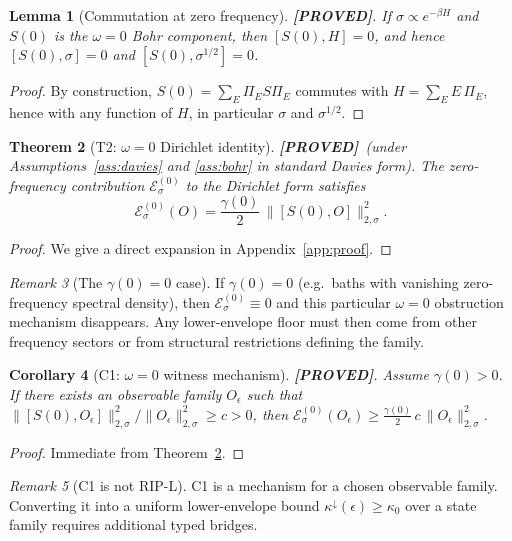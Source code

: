 \documentclass[11pt]{article}
\newtheorem{theorem}{Theorem}[section]
\newtheorem{lemma}[theorem]{Lemma}
\newtheorem{corollary}[theorem]{Corollary}
\theoremstyle{definition}
\theoremstyle{remark}
\newtheorem{remark}[theorem]{Remark}
\newcommand{\PROVED}{\textcolor{green!60!black}{\textbf{[PROVED]}}}
\begin{document}
\begin{lemma}[Commutation at zero frequency]
\label{lem:commute}
\PROVED. If $\sigma \propto e^{-\beta H}$ and $S(0)$ is the $\omega = 0$
Bohr component, then $[S(0), H] = 0$, and hence $[S(0), \sigma] = 0$ and
$[S(0), \sigma^{1/2}] = 0$.
\end{lemma}

\begin{proof}
By construction, $S(0) = \sum_E \Pi_E S \Pi_E$ commutes with $H = \sum_E
E\, \Pi_E$, hence with any function of $H$, in particular $\sigma$ and
$\sigma^{1/2}$.
\end{proof}

\begin{theorem}[T2: $\omega = 0$ Dirichlet identity]
\label{thm:omega0}
\PROVED\ (under Assumptions~\ref{ass:davies} and \ref{ass:bohr} in
standard Davies form). The zero-frequency contribution
$\mathcal{E}^{(0)}_\sigma$ to the Dirichlet form satisfies
\[
\mathcal{E}^{(0)}_\sigma(O) = \frac{\gamma(0)}{2}\,
\|[S(0), O]\|^{2}_{2,\sigma}.
\]
\end{theorem}

\begin{proof}
We give a direct expansion in Appendix~\ref{app:proof}.
\end{proof}

\begin{remark}[The $\gamma(0) = 0$ case]
\label{rem:gamma0}
If $\gamma(0) = 0$ (e.g.\ baths with vanishing zero-frequency spectral
density), then $\mathcal{E}^{(0)}_\sigma \equiv 0$ and this particular
$\omega = 0$ obstruction mechanism disappears. Any lower-envelope floor
must then come from other frequency sectors or from structural
restrictions defining the family.
\end{remark}

\begin{corollary}[C1: $\omega = 0$ witness mechanism]
\label{cor:witness}
\PROVED. Assume $\gamma(0) > 0$. If there exists an observable family
$O_\epsilon$ such that
$\|[S(0), O_\epsilon]\|^{2}_{2,\sigma} \big/ \|O_\epsilon\|^{2}_{2,\sigma}
\ge c > 0$, then
$\mathcal{E}^{(0)}_\sigma(O_\epsilon) \ge \frac{\gamma(0)}{2}\, c\,
\|O_\epsilon\|^{2}_{2,\sigma}$.
\end{corollary}

\begin{proof}
Immediate from Theorem~\ref{thm:omega0}.
\end{proof}

\begin{remark}[C1 is not RIP-L]
\label{rem:notripl}
C1 is a mechanism for a chosen observable family. Converting it into a
uniform lower-envelope bound $\kappa^{\downarrow}(\epsilon) \ge \kappa_0$
over a state family requires additional typed bridges.
\end{remark}
\end{document}
